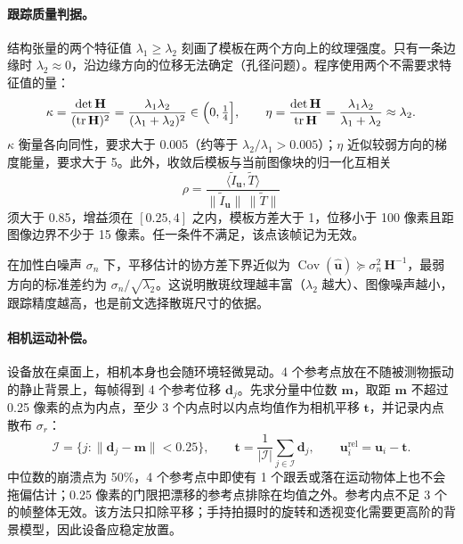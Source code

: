 \paragraph{跟踪质量判据。}结构张量的两个特征值 $\lambda_1\ge\lambda_2$ 刻画了模板在两个方向上的纹理强度。只有一条边缘时 $\lambda_2\approx0$，沿边缘方向的位移无法确定（孔径问题）。程序使用两个不需要求特征值的量：
\begin{equation}
\kappa=\frac{\det\mathbf H}{(\operatorname{tr}\mathbf H)^2}=\frac{\lambda_1\lambda_2}{(\lambda_1+\lambda_2)^2}\in\Bigl(0,\tfrac14\Bigr],\qquad
\eta=\frac{\det\mathbf H}{\operatorname{tr}\mathbf H}=\frac{\lambda_1\lambda_2}{\lambda_1+\lambda_2}\approx\lambda_2 .
\end{equation}
$\kappa$ 衡量各向同性，要求大于 0.005（约等于 $\lambda_2/\lambda_1>0.005$）；$\eta$ 近似较弱方向的梯度能量，要求大于 5。此外，收敛后模板与当前图像块的归一化互相关
\begin{equation}
\rho=\frac{\langle\tilde I_{\mathbf u},\tilde T\rangle}{\lVert\tilde I_{\mathbf u}\rVert\,\lVert\tilde T\rVert}
\end{equation}
须大于 0.85，增益须在 $[0.25,4]$ 之内，模板方差大于 1，位移小于 100 像素且距图像边界不少于 15 像素。任一条件不满足，该点该帧记为无效。

在加性白噪声 $\sigma_n$ 下，平移估计的协方差下界近似为 $\operatorname{Cov}(\hat{\mathbf u})\succeq\sigma_n^2\,\mathbf H^{-1}$，最弱方向的标准差约为 $\sigma_n/\sqrt{\lambda_2}$。这说明散斑纹理越丰富（$\lambda_2$ 越大）、图像噪声越小，跟踪精度越高，也是前文选择散斑尺寸的依据。

\paragraph{相机运动补偿。}设备放在桌面上，相机本身也会随环境轻微晃动。4 个参考点放在不随被测物振动的静止背景上，每帧得到 4 个参考位移 $\mathbf{d}_j$。先求分量中位数 $\mathbf{m}$，取距 $\mathbf{m}$ 不超过 0.25 像素的点为内点，至少 3 个内点时以内点均值作为相机平移 $\mathbf{t}$，并记录内点散布 $\sigma_r$：
\begin{equation}
\mathcal{I}=\bigl\{j:\lVert\mathbf d_j-\mathbf m\rVert<0.25\bigr\},\qquad
\mathbf t=\frac{1}{|\mathcal I|}\sum_{j\in\mathcal I}\mathbf d_j,\qquad
\mathbf u_i^{\mathrm{rel}}=\mathbf u_i-\mathbf t .
\end{equation}
中位数的崩溃点为 50\%，4 个参考点中即使有 1 个跟丢或落在运动物体上也不会拖偏估计；0.25 像素的门限把漂移的参考点排除在均值之外。参考内点不足 3 个的帧整体无效。该方法只扣除平移；手持拍摄时的旋转和透视变化需要更高阶的背景模型，因此设备应稳定放置。

